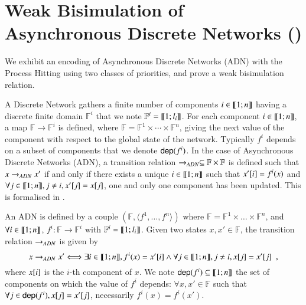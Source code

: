 
\section{Weak Bisimulation of Asynchronous Discrete Networks ()}
\label{suppl:demotrad}

We exhibit an encoding of Asynchronous Discrete Networks (ADN) with the Process
Hitting using two classes of priorities, and prove a weak bisimulation relation.

A Discrete Network gathers a finite number of components $i\in\llbracket 1; n \rrbracket$ having a discrete finite domain
$\mathbb F^i$ that we note $\mathbb{F}^i = \llbracket 1; l_i \rrbracket$.
For each component $i\in\llbracket 1; n \rrbracket$, a map $\mathbb F \rightarrow \mathbb F^i$ is defined, where
$\mathbb F = \mathbb F^1 \times \cdots \times \mathbb F^n$, giving the next value of the component
with respect to the global state of the network.
Typically $f^i$ depends on a subset of components that we denote $\mathsf{dep}(f^i)$.
In the case of Asynchronous Discrete Networks (ADN), a transition relation $\rightarrow_{ADN}\subseteq \mathbb
F\times \mathbb F$ is defined such that $x\rightarrow_{ADN} x'$ if and only if there exists a unique
$i\in\llbracket 1; n \rrbracket$ such that $x'[{i}]=f^i(x)$ and $\forall j\in\llbracket 1; n \rrbracket, j\neq i, x'[{j}]
=x[{j}]$, \ie one and only one component has been updated.
This is formalised in .

\begin{definition}
\label{def:DN}
  An ADN is defined by a couple $(\mathbb F, \langle f^1, \dots, f^n \rangle)$
  where $\mathbb{F} = \mathbb{F}^1\times\dots\times\mathbb{F}^n$,
  and $\forall i\in\llbracket 1; n \rrbracket$,
  $f^i: \mathbb{F} \rightarrow \mathbb{F}^i$ with
  $\mathbb{F}^i = \llbracket 1; l_i \rrbracket$.
  Given two states $x,x'\in\mathbb F$, the transition relation $\rightarrow_{ADN}$ is given by
  \[
  x\rightarrow_{ADN} x' \Longleftrightarrow
    \exists i\in\llbracket 1; n \rrbracket, f^i(x)=x'[{i}]
    \wedge \forall j\in\llbracket 1; n \rrbracket, j\neq i, x[{j}]=x'[{j}]
  \enspace,
  \]
  where $x[{i}]$ is the $i$-th component of $x$.
  We note $\mathsf{dep}(f^i)\subseteq \llbracket 1; n \rrbracket$ the set of components on which the value of $f^i$
  depends: $\forall x,x'\in \mathbb F$ such that $\forall
  j\in\mathsf{dep}(f^i), x[{j}]=x'[{j}]$, necessarily $f^i(x)=f^i(x')$.
\end{definition}


